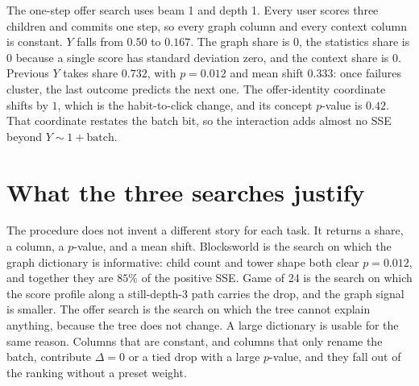 \documentclass[11pt,a4paper]{article}
\begin{document}
The one-step offer search uses beam 1 and depth 1.
Every user scores three children and commits one step, so every graph column and every context column is constant.
\(Y\) falls from \(0.50\) to \(0.167\).
The graph share is \(0\), the statistics share is \(0\) because a single score has standard deviation zero, and the context share is \(0\).
Previous \(Y\) takes share \(0.732\), with \(p=0.012\) and mean shift \(0.333\): once failures cluster, the last outcome predicts the next one.
The offer-identity coordinate shifts by \(1\), which is the habit-to-click change, and its concept \(p\)-value is \(0.42\).
That coordinate restates the batch bit, so the interaction adds almost no SSE beyond \(Y\sim 1+\mathrm{batch}\).

\section{What the three searches justify}
The procedure does not invent a different story for each task.
It returns a share, a column, a \(p\)-value, and a mean shift.
Blocksworld is the search on which the graph dictionary is informative: child count and tower shape both clear \(p=0.012\), and together they are \(85\%\) of the positive SSE.
Game of 24 is the search on which the score profile along a still-depth-3 path carries the drop, and the graph signal is smaller.
The offer search is the search on which the tree cannot explain anything, because the tree does not change.
A large dictionary is usable for the same reason.
Columns that are constant, and columns that only rename the batch, contribute \(\Delta=0\) or a tied drop with a large \(p\)-value, and they fall out of the ranking without a preset weight.
\end{document}
